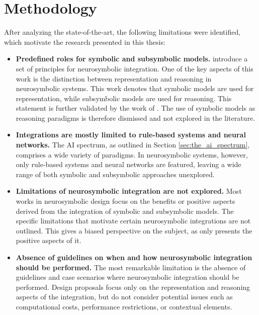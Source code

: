 \chapter{Methodology}

After analyzing the state-of-the-art, the following limitations were identified, which motivate the research presented in this thesis:
\begin{itemize}
    \item \textbf{Predefined roles for symbolic and subsymbolic models.} \cite{besold_neural-symbolic_2017} introduce a set of principles for neurosymbolic integration. One of the key aspects of this work is the distinction between representation and reasoning in neurosymbolic systems. This work denotes that symbolic models are used for representation, while subsymbolic models are used for reasoning. This statement is further validated by the work of \cite{garcez_neural-symbolic_2019}. The use of symbolic models as reasoning paradigms is therefore dismissed and not explored in the literature.
    
    \item \textbf{Integrations are mostly limited to rule-based systems and neural networks.} The AI spectrum, as outlined in Section \ref{sec:the_ai_spectrum}, comprises a wide variety of paradigms. In neurosymbolic systems, however, only rule-based systems and neural networks are featured, leaving a wide range of both symbolic and subsymbolic approaches unexplored. 
    
    \item \textbf{Limitations of neurosymbolic integration are not explored.} Most works in neurosymbolic design focus on the benefits or positive aspects derived from the integration of symbolic and subsymbolic models. The specific limitations that motivate certain neurosymbolic integrations are not outlined. This gives a biased perspective on the subject, as only presents the positive aspects of it.
    
    \item \textbf{Absence of guidelines on when and how neurosymbolic integration should be performed.} The most remarkable limitation is the absence of guidelines and case scenarios where neurosymbolic integration should be performed. Design proposals focus only on the representation and reasoning aspects of the integration, but do not consider potential issues such as computational costs, performance restrictions, or contextual elements. 
\end{itemize}



